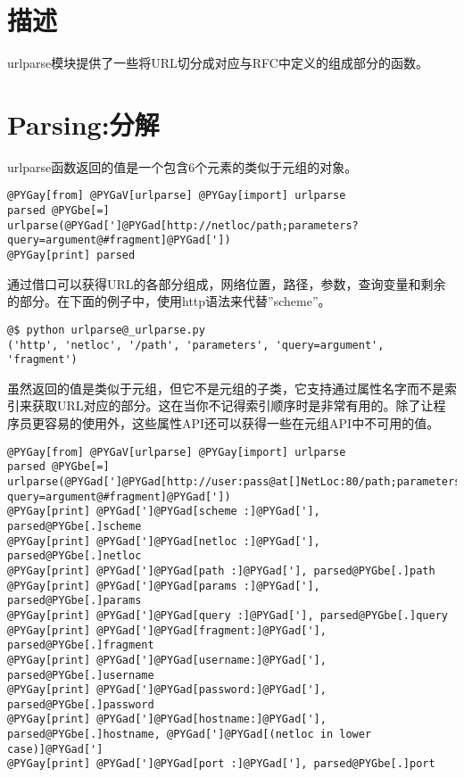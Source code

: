 \documentclass[a4paper,10pt,english]{manual}
\begin{document}
\section{描述}

urlparse模块提供了一些将URL切分成对应与RFC中定义的组成部分的函数。


\section{Parsing:分解}

urlparse函数返回的值是一个包含6个元素的类似于元组的对象。

\begin{Verbatim}[commandchars=@\[\]]
@PYGay[from] @PYGaV[urlparse] @PYGay[import] urlparse
parsed @PYGbe[=] urlparse(@PYGad[']@PYGad[http://netloc/path;parameters?query=argument@#fragment]@PYGad['])
@PYGay[print] parsed
\end{Verbatim}

通过借口可以获得URL的各部分组成，网络位置，路径，参数，查询变量和剩余的部分。在下面的例子中，使用http语法来代替''scheme''。

\begin{Verbatim}[commandchars=@\[\]]
@$ python urlparse@_urlparse.py
('http', 'netloc', '/path', 'parameters', 'query=argument', 'fragment')
\end{Verbatim}

虽然返回的值是类似于元组，但它不是元组的子类，它支持通过属性名字而不是索引来获取URL对应的部分。这在当你不记得索引顺序时是非常有用的。除了让程序员更容易的使用外，这些属性API还可以获得一些在元组API中不可用的值。

\begin{Verbatim}[commandchars=@\[\]]
@PYGay[from] @PYGaV[urlparse] @PYGay[import] urlparse
parsed @PYGbe[=] urlparse(@PYGad[']@PYGad[http://user:pass@at[]NetLoc:80/path;parameters?query=argument@#fragment]@PYGad['])
@PYGay[print] @PYGad[']@PYGad[scheme :]@PYGad['], parsed@PYGbe[.]scheme
@PYGay[print] @PYGad[']@PYGad[netloc :]@PYGad['], parsed@PYGbe[.]netloc
@PYGay[print] @PYGad[']@PYGad[path :]@PYGad['], parsed@PYGbe[.]path
@PYGay[print] @PYGad[']@PYGad[params :]@PYGad['], parsed@PYGbe[.]params
@PYGay[print] @PYGad[']@PYGad[query :]@PYGad['], parsed@PYGbe[.]query
@PYGay[print] @PYGad[']@PYGad[fragment:]@PYGad['], parsed@PYGbe[.]fragment
@PYGay[print] @PYGad[']@PYGad[username:]@PYGad['], parsed@PYGbe[.]username
@PYGay[print] @PYGad[']@PYGad[password:]@PYGad['], parsed@PYGbe[.]password
@PYGay[print] @PYGad[']@PYGad[hostname:]@PYGad['], parsed@PYGbe[.]hostname, @PYGad[']@PYGad[(netloc in lower case)]@PYGad[']
@PYGay[print] @PYGad[']@PYGad[port :]@PYGad['], parsed@PYGbe[.]port
\end{Verbatim}
\end{document}
